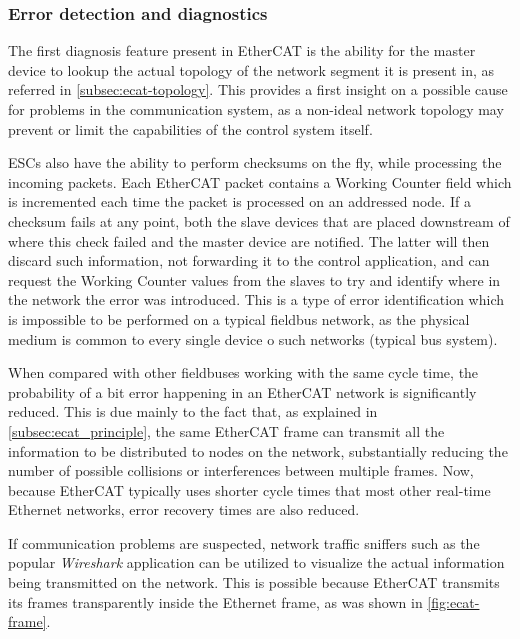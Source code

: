\subsubsection{Error detection and diagnostics}

The first diagnosis feature present in EtherCAT is the ability for the master device to lookup the actual topology of the network segment it is present in, as referred in \ref{subsec:ecat-topology}.
This provides a first insight on a possible cause for problems in the communication system, as a non-ideal network topology may prevent or limit the capabilities of the control system itself.

ESCs also have the ability to perform checksums on the fly, while processing the incoming packets.
Each EtherCAT packet contains a Working Counter field which is incremented each time the packet is processed on an addressed node.
If a checksum fails at any point, both the slave devices that are placed downstream of where this check failed and the master device are notified.
The latter will then discard such information, not forwarding it to the control application, and can request the Working Counter values from the slaves to try and identify where in the network the error was introduced.
This is a type of error identification which is impossible to be performed on a typical fieldbus network, as the physical medium is common to every single device o such networks (typical bus system).

When compared with other fieldbuses working with the same cycle time, the probability of a bit error happening in an EtherCAT network is significantly reduced.
This is due mainly to the fact that, as explained in \ref{subsec:ecat_principle}, the same EtherCAT frame can transmit all the information to be distributed to nodes on the network, substantially reducing the number of possible collisions or interferences between multiple frames.
Now, because EtherCAT typically uses shorter cycle times that most other real-time Ethernet networks, error recovery times are also reduced.

If communication problems are suspected, network traffic sniffers such as the popular \emph{Wireshark} application can be utilized to visualize the actual information being transmitted on the network.
This is possible because EtherCAT transmits its frames transparently inside the Ethernet frame, as was shown in \autoref{fig:ecat-frame}.
